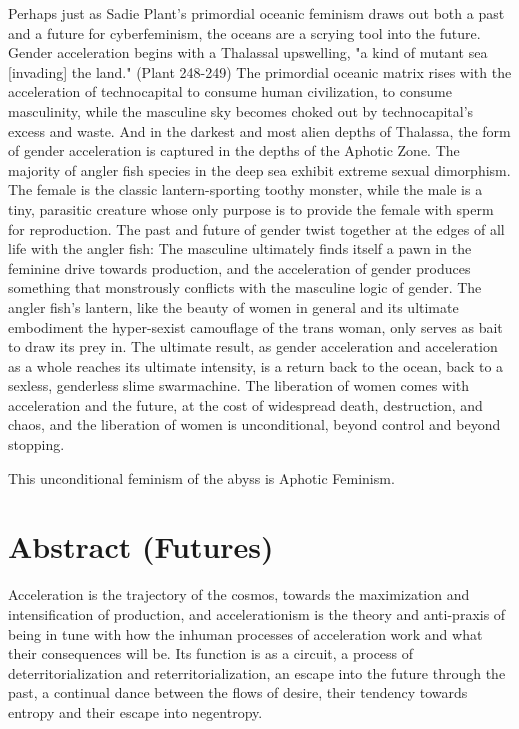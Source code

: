 \documentclass[12pt, a5paper, twoside, openright]{memoir}
\begin{document}
Perhaps just as Sadie Plant's primordial oceanic feminism draws out both a past and a future for cyberfeminism, the oceans are a scrying tool into the future. Gender acceleration begins with a Thalassal upswelling, "a kind of mutant sea [invading] the land." (Plant 248-249) The primordial oceanic matrix rises with the acceleration of technocapital to consume human civilization, to consume masculinity, while the masculine sky becomes choked out by technocapital's excess and waste. And in the darkest and most alien depths of Thalassa, the form of gender acceleration is captured in the depths of the Aphotic Zone. The majority of angler fish species in the deep sea exhibit extreme sexual dimorphism. The female is the classic lantern-sporting toothy monster, while the male is a tiny, parasitic creature whose only purpose is to provide the female with sperm for reproduction. The past and future of gender twist together at the edges of all life with the angler fish: The masculine ultimately finds itself a pawn in the feminine drive towards production, and the acceleration of gender produces something that monstrously conflicts with the masculine logic of gender. The angler fish's lantern, like the beauty of women in general and its ultimate embodiment the hyper-sexist camouflage of the trans woman, only serves as bait to draw its prey in. The ultimate result, as gender acceleration and acceleration as a whole reaches its ultimate intensity, is a return back to the ocean, back to a sexless, genderless slime swarmachine. The liberation of women comes with acceleration and the future, at the cost of widespread death, destruction, and chaos, and the liberation of women is unconditional, beyond control and beyond stopping.

This unconditional feminism of the abyss is Aphotic Feminism.

\chapter{Abstract (Futures)}

Acceleration is the trajectory of the cosmos, towards the maximization and intensification of production, and accelerationism is the theory and anti-praxis of being in tune with how the inhuman processes of acceleration work and what their consequences will be. Its function is as a circuit, a process of deterritorialization and reterritorialization, an escape into the future through the past, a continual dance between the flows of desire, their tendency towards entropy and their escape into negentropy.
\end{document}
